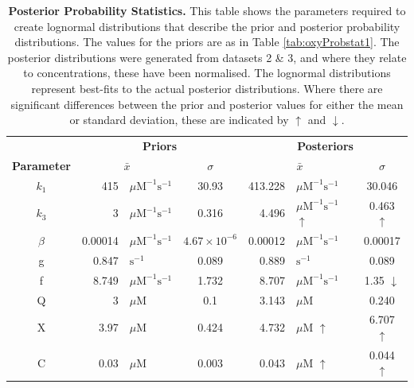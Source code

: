 \begin{table}[tbp]%
\renewcommand{\arraystretch}{1.5}
\begin{center}
\begin{tabular}{crlc|rlc}
\toprule
& \multicolumn{3}{c}{\textbf{Priors}} & \multicolumn{3}{c}{\textbf{Posteriors}} \\
\textbf{Parameter} & \multicolumn{2}{c}{${\bar{x}}$} & $\sigma$ & \multicolumn{2}{c}{${\bar{x}}$} & $\sigma$\\
\midrule
$k_1$ & 415 & $\mu \mathrm{M}^{-1} \mathrm{s}^{-1}$ & 30.93 & 413.228 & $\mu \mathrm{M}^{-1} \mathrm{s}^{-1}$ & 30.046\\
$k_3$ & 3 & $\mu \mathrm{M}^{-1} \mathrm{s}^{-1}$ & 0.316 & 4.496 & $\mu \mathrm{M}^{-1} \mathrm{s}^{-1}$ $\uparrow$ & 0.463 $\uparrow$\\
$\beta$ & 0.00014 & $\mu \mathrm{M}^{-1} \mathrm{s}^{-1}$ & $4.67\times 10^{-6}$ & 0.00012 & $\mu \mathrm{M}^{-1} \mathrm{s}^{-1}$ & 0.00017\\
g & 0.847 & $\mathrm{s}^{-1}$ & 0.089 & 0.889 & $\mathrm{s}^{-1}$ & 0.089\\
f & 8.749 & $\mu \mathrm{M}^{-1} \mathrm{s}^{-1}$ & 1.732 & 8.707 & $\mu \mathrm{M}^{-1} \mathrm{s}^{-1}$ & 1.35 $\downarrow$\\
Q & 3 & $\mu \mathrm{M}$ & 0.1 & 3.143 & $\mu \mathrm{M}$ & 0.240\\
X & 3.97 & $\mu \mathrm{M}$ & 0.424 & 4.732 & $\mu \mathrm{M}$ $\uparrow$ & 6.707 $\uparrow$\\
C & 0.03 & $\mu \mathrm{M}$ & 0.003 & 0.043 & $\mu \mathrm{M}$ $\uparrow$ & 0.044 $\uparrow$\\
\bottomrule
\end{tabular}
\end{center}
\caption[Posterior Probability Statistics]{{\bf Posterior Probability Statistics.} This table shows the parameters required to create lognormal distributions that describe the prior and posterior probability distributions. The values for the priors are as in Table \ref{tab:oxyProbstat1}. The posterior distributions were generated from datasets 2 \& 3, and where they relate to concentrations, these have been normalised. The lognormal distributions represent best-fits to the actual posterior distributions. Where there are significant differences between the prior and posterior values for either the mean or standard deviation, these are indicated by $\uparrow$ and $\downarrow$.
\label{tab:oxyPstat}}
\end{table}

